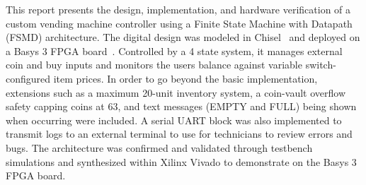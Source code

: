 This report presents the design, implementation, and hardware verification of a custom vending machine controller using a Finite State Machine with Datapath (FSMD) architecture. The digital design was modeled in Chisel~\cite{chiselBook} and deployed on a Basys 3 FPGA board~\cite{basys3}.
Controlled by a 4 state system, it manages external coin and buy inputs and monitors the users balance against variable switch-configured item prices. In order to go beyond the basic implementation, extensions such as a maximum 20-unit inventory system, a coin-vault overflow safety capping coins at 63, and text messages (EMPTY and FULL) being shown when occurring were included.
A serial UART block was also implemented to transmit logs to an external terminal to use for technicians to review errors and bugs. The architecture was confirmed and validated through testbench simulations and synthesized within Xilinx Vivado to demonstrate on the Basys 3 FPGA board.